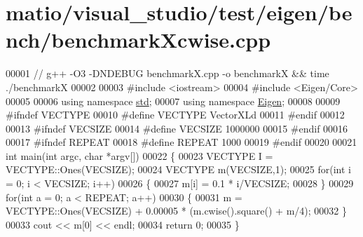 \hypertarget{matio_2visual__studio_2test_2eigen_2bench_2benchmark_xcwise_8cpp_source}{}\section{matio/visual\+\_\+studio/test/eigen/bench/benchmark\+Xcwise.cpp}
\label{matio_2visual__studio_2test_2eigen_2bench_2benchmark_xcwise_8cpp_source}

\begin{DoxyCode}
00001 \textcolor{comment}{// g++ -O3 -DNDEBUG benchmarkX.cpp -o benchmarkX && time ./benchmarkX}
00002 
00003 \textcolor{preprocessor}{#include <iostream>}
00004 \textcolor{preprocessor}{#include <Eigen/Core>}
00005 
00006 \textcolor{keyword}{using namespace }\hyperlink{namespacestd}{std};
00007 \textcolor{keyword}{using namespace }\hyperlink{namespace_eigen}{Eigen};
00008 
00009 \textcolor{preprocessor}{#ifndef VECTYPE}
00010 \textcolor{preprocessor}{#define VECTYPE VectorXLd}
00011 \textcolor{preprocessor}{#endif}
00012 
00013 \textcolor{preprocessor}{#ifndef VECSIZE}
00014 \textcolor{preprocessor}{#define VECSIZE 1000000}
00015 \textcolor{preprocessor}{#endif}
00016 
00017 \textcolor{preprocessor}{#ifndef REPEAT}
00018 \textcolor{preprocessor}{#define REPEAT 1000}
00019 \textcolor{preprocessor}{#endif}
00020 
00021 \textcolor{keywordtype}{int} main(\textcolor{keywordtype}{int} argc, \textcolor{keywordtype}{char} *argv[])
00022 \{
00023     VECTYPE I = VECTYPE::Ones(VECSIZE);
00024     VECTYPE m(VECSIZE,1);
00025     \textcolor{keywordflow}{for}(\textcolor{keywordtype}{int} i = 0; i < VECSIZE; i++)
00026     \{
00027         m[i] = 0.1 * i/VECSIZE;
00028     \}
00029     \textcolor{keywordflow}{for}(\textcolor{keywordtype}{int} a = 0; a < REPEAT; a++)
00030     \{
00031         m = VECTYPE::Ones(VECSIZE) + 0.00005 * (m.cwise().square() + m/4);
00032     \}
00033     cout << m[0] << endl;
00034     \textcolor{keywordflow}{return} 0;
00035 \}
\end{DoxyCode}
